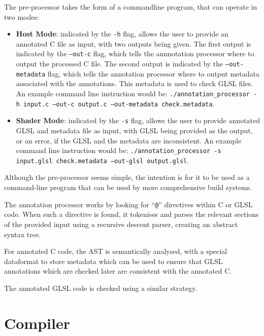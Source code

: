 \documentclass[a4paper,12pt,twoside,openright]{report}
\begin{document}
The pre-processor takes the form of a commandline program, that can operate
in two modes:

\begin{itemize}

    \item \textbf{Host Mode}: indicated by the \texttt{-h} flag, allows the
    user to provide an annotated C file as input, with two outputs being given.
    The first output is indicated by the \texttt{--out-c} flag, which tells the
    annnotation processor where to output the processed C file. The second
    output is indicated by the \texttt{--out-metadata} flag, which tells the
    annotation processor where to output metadata associated with the
    annotations. This metadata is used to check GLSL files. An example command
    line instruction would be: \texttt{./annotation\_processor -h input.c
    --out-c output.c --out-metadata check.metadata}.

    \item \textbf{Shader Mode}: indicated by the \texttt{-s} flag, allows the
    user to provide annotated GLSL and metadata file as input, with GLSL being
    provided as the output, or an error, if the GLSL and the metadata are
    inconsistent. An example command line instruction would be:
    \texttt{./annotation\_processor -s input.glsl check.metadata --out-glsl
    output.glsl}.

\end{itemize}

Although the pre-processor seems simple, the intention is for it to be used as
a command-line program that can be used by more comprehensive build systems.

The annotation processor works by looking for ``\texttt{@}'' directives within
C or GLSL code. When such a directive is found, it tokenises and parses the
relevant sections of the provided input using a recursive descent parser,
creating an abstract syntax tree.

For annotated C code, the AST is semantically analysed, with a special
dataformat to store metadata which can be used to ensure that GLSL annotations
which are checked later are consistent with the annotated C.

The annotated GLSL code is checked using a similar strategy.


\section{Compiler}
\end{document}
